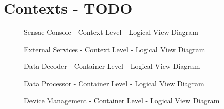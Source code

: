 \chapter{Contexts - TODO}
\label{AppendixH}

\begin{landscape}
    \begin{figure}[H]
       \centering
    \resizebox{\columnwidth}{!}
    {      
       
    }
    \caption[Sensae Console - Context Level - Logical View Diagram]{Sensae Console - Context Level - Logical View Diagram}
       \label{fig:AppendixH:contexts}
    \end{figure}
\end{landscape}

\begin{figure}[H]
    \centering
    \resizebox{\columnwidth}{!}
    {      
        
    }
    \caption[External Services - Context Level - Logical View Diagram]{External Services - Context Level - Logical View Diagram}
    \label{fig:AppendixH:servicecontexts}
\end{figure}

\begin{figure}[H]
    \centering
    \resizebox{\columnwidth}{!}
        {      
        
        }
    \caption[Data Decoder - Container Level - Logical View Diagram]{Data Decoder - Container Level - Logical View Diagram}
    \label{fig:AppendixH:decoder}
\end{figure}

\begin{figure}[H]
    \centering
    \resizebox{\columnwidth}{!}
        {      
        
        }
    \caption[Data Processor - Container Level - Logical View Diagram]{Data Processor - Container Level - Logical View Diagram}
    \label{fig:AppendixH:processor}
\end{figure}

\begin{figure}[H]
    \centering
    \resizebox{\columnwidth}{!}
        {      
        
        }
    \caption[Device Management - Container Level - Logical View Diagram]{Device Management - Container Level - Logical View Diagram}
    \label{fig:AppendixH:device}
\end{figure}

